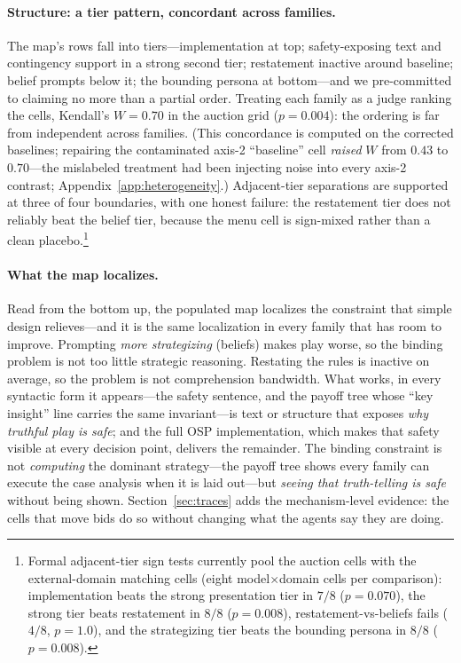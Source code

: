 \paragraph{Structure: a tier pattern, concordant across families.}
The map's rows fall into tiers---implementation at top; safety-exposing text and contingency support in a strong second tier; restatement inactive around baseline; belief prompts below it; the bounding persona at bottom---and we pre-committed to claiming no more than a partial order. Treating each family as a judge ranking the cells, Kendall's $W = 0.70$ in the auction grid ($p = 0.004$): the ordering is far from independent across families. (This concordance is computed on the corrected baselines; repairing the contaminated axis-2 ``baseline'' cell \emph{raised} $W$ from $0.43$ to $0.70$---the mislabeled treatment had been injecting noise into every axis-2 contrast; Appendix~\ref{app:heterogeneity}.) Adjacent-tier separations are supported at three of four boundaries, with one honest failure: the restatement tier does not reliably beat the belief tier, because the menu cell is sign-mixed rather than a clean placebo.\footnote{Formal adjacent-tier sign tests currently pool the auction cells with the external-domain matching cells (eight model$\times$domain cells per comparison): implementation beats the strong presentation tier in $7/8$ ($p = 0.070$), the strong tier beats restatement in $8/8$ ($p = 0.008$), restatement-vs-beliefs fails ($4/8$, $p = 1.0$), and the strategizing tier beats the bounding persona in $8/8$ ($p = 0.008$). }

\paragraph{What the map localizes.}
Read from the bottom up, the populated map localizes the constraint that simple design relieves---and it is the same localization in every family that has room to improve. Prompting \emph{more strategizing} (beliefs) makes play worse, so the binding problem is not too little strategic reasoning. Restating the rules is inactive on average, so the problem is not comprehension bandwidth. What works, in every syntactic form it appears---the safety sentence, and the payoff tree whose ``key insight'' line carries the same invariant---is text or structure that exposes \emph{why truthful play is safe}; and the full OSP implementation, which makes that safety visible at every decision point, delivers the remainder. The binding constraint is not \emph{computing} the dominant strategy---the payoff tree shows every family can execute the case analysis when it is laid out---but \emph{seeing that truth-telling is safe} without being shown. Section~\ref{sec:traces} adds the mechanism-level evidence: the cells that move bids do so without changing what the agents say they are doing.

